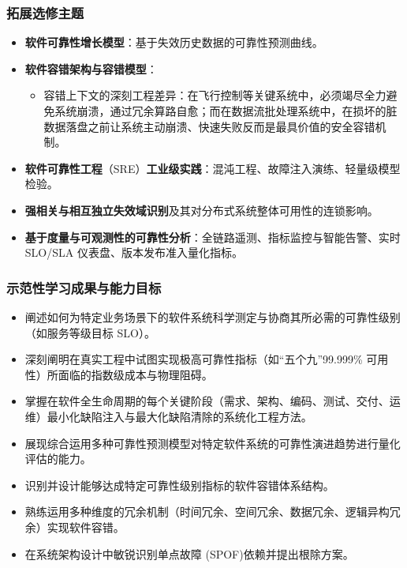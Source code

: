 \subsubsection{拓展选修主题}
\begin{itemize}
    \item \textbf{软件可靠性增长模型}：基于失效历史数据的可靠性预测曲线。
    \item \textbf{软件容错架构与容错模型}：
    \begin{itemize}
        \item 容错上下文的深刻工程差异：在飞行控制等关键系统中，必须竭尽全力避免系统崩溃，通过冗余算路自愈；而在数据流批处理系统中，在损坏的脏数据落盘之前让系统主动崩溃、快速失败反而是最具价值的安全容错机制。
    \end{itemize}
    \item \textbf{软件可靠性工程}（SRE）\textbf{工业级实践}：混沌工程、故障注入演练、轻量级模型检验。
    \item \textbf{强相关与相互独立失效域识别}及其对分布式系统整体可用性的连锁影响。
    \item \textbf{基于度量与可观测性的可靠性分析}：全链路遥测、指标监控与智能告警、实时 SLO/SLA 仪表盘、版本发布准入量化指标。
\end{itemize}

\subsubsection{示范性学习成果与能力目标}
\begin{itemize}
    \item 阐述如何为特定业务场景下的软件系统科学测定与协商其所必需的可靠性级别（如服务等级目标 SLO）。
    \item 深刻阐明在真实工程中试图实现极高可靠性指标（如“五个九”99.999\% 可用性）所面临的指数级成本与物理阻碍。
    \item 掌握在软件全生命周期的每个关键阶段（需求、架构、编码、测试、交付、运维）最小化缺陷注入与最大化缺陷清除的系统化工程方法。
    \item 展现综合运用多种可靠性预测模型对特定软件系统的可靠性演进趋势进行量化评估的能力。
    \item 识别并设计能够达成特定可靠性级别指标的软件容错体系结构。
    \item 熟练运用多种维度的冗余机制（时间冗余、空间冗余、数据冗余、逻辑异构冗余）实现软件容错。
    \item 在系统架构设计中敏锐识别单点故障 (SPOF)依赖并提出根除方案。
\end{itemize}

